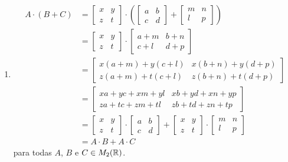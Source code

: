 \documentclass[12pt]{exam}
\begin{document}
\begin{enumerate}[label={\roman*})]
    \item
    \begin{align*}
        A\cdot(B + C) &= \begin{bmatrix}
        x & y\\z & t 
    \end{bmatrix}\cdot\left(\begin{bmatrix}
        a & b\\c & d 
    \end{bmatrix} + \begin{bmatrix}
        m & n\\
        l & p
    \end{bmatrix}\right)\\ &= \begin{bmatrix}
        x & y\\z & t 
    \end{bmatrix}\cdot \begin{bmatrix}
        a + m & b + n\\
        c + l & d + p
    \end{bmatrix}\\ &= \begin{bmatrix}
        x(a + m) + y(c + l) & x(b + n) + y(d + p)\\
        z(a + m) + t(c + l) & z(b + n) + t(d + p)
    \end{bmatrix}\\ &= \begin{bmatrix}
        xa + yc + xm + yl & xb + yd + xn + yp\\
        za + tc + zm + tl & zb + td + zn + tp
    \end{bmatrix}\\ &= \begin{bmatrix}
        x & y\\z & t 
    \end{bmatrix}\cdot \begin{bmatrix}
        a & b\\c & d 
    \end{bmatrix} + \begin{bmatrix}
        x & y\\z & t 
    \end{bmatrix}\cdot \begin{bmatrix}
        m & n\\
        l & p
    \end{bmatrix}\\ &= A\cdot B + A \cdot C
    \end{align*}
    para todas $A$, $B$ e $C \in M_2(\mathbb{R})$.
\end{enumerate}
\end{document}
